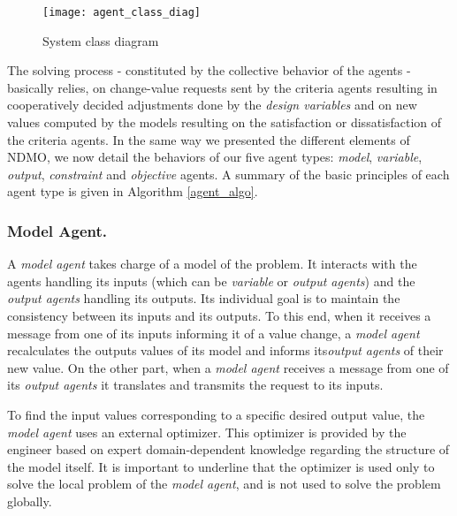 \begin{figure}
\texttt{[image: agent\_class\_diag]}
\caption{System class diagram}\label{SMA_class_diagram}

\end{figure}

The solving process - constituted by the collective behavior of the agents - basically relies, on change-value requests sent by the criteria agents resulting in cooperatively decided adjustments done by the \emph{design variables} and on new values computed by the models resulting on the satisfaction or dissatisfaction of the criteria agents. 
In the same way we presented the different elements of NDMO, we now detail the behaviors of our five agent types: \emph{model}, \emph{variable}, \emph{output}, \emph{constraint} and \emph{objective} agents.
A summary of the basic principles of each agent type is given in Algorithm \ref{agent_algo}.

\subsubsection*{Model Agent.}

A \emph{model agent} takes charge of a model of the problem. It interacts with the agents handling its inputs (which can be \emph{variable} or \emph{output agents}) and the \emph{output agents} handling its outputs. Its individual goal is to maintain the consistency between its inputs and its outputs. To this end, when it receives a message from one of its inputs informing it of a value change, a \emph{model agent} recalculates the outputs values of its model and informs its\emph{output agents} of their new value. On the other part, when a \emph{model agent} receives a message from one of its \emph{output agents} it translates and transmits the request to its inputs. 

To find the input values corresponding to a specific desired output value, the \emph{model agent} uses an external optimizer. This optimizer is provided by the engineer based on expert domain-dependent knowledge regarding the structure of the model itself.
It is important to underline that the optimizer is used only to solve the local problem of the \emph{model agent}, and is  not used to solve the problem globally.



